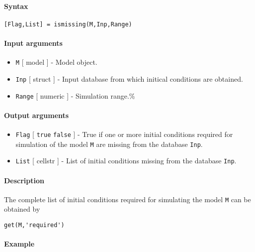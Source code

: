 


	\paragraph{Syntax}\label{syntax}

\begin{verbatim}
[Flag,List] = ismissing(M,Inp,Range)
\end{verbatim}

\paragraph{Input arguments}\label{input-arguments}

\begin{itemize}
\item
  \texttt{M} {[} model {]} - Model object.
\item
  \texttt{Inp} {[} struct {]} - Input database from which initical
  conditions are obtained.
\item
  \texttt{Range} {[} numeric {]} - Simulation range.\%
\end{itemize}

\paragraph{Output arguments}\label{output-arguments}

\begin{itemize}
\item
  \texttt{Flag} {[} \texttt{true} \textbar{} \texttt{false} {]} - True
  if one or more initial conditions required for simulation of the model
  \texttt{M} are missing from the database \texttt{Inp}.
\item
  \texttt{List} {[} cellstr {]} - List of initial conditions missing
  from the database \texttt{Inp}.
\end{itemize}

\paragraph{Description}\label{description}

The complete list of initial conditions required for simulating the
model \texttt{M} can be obtained by

\begin{verbatim}
get(M,'required')
\end{verbatim}

\paragraph{Example}\label{example}


